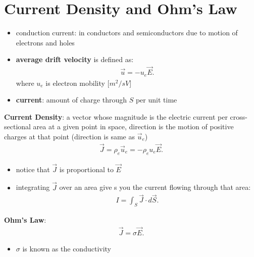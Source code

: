 \documentclass[10pt]{article}
\begin{document}
\section{Current Density and Ohm's Law}
\begin{itemize}
    \item conduction current: in conductors and semiconductors due to motion of electrons and holes
    \item \textbf{average drift velocity} is defined as:
        \begin{gather*}
            \vec{u} = -u_e \vec{E} 
        .\end{gather*}
        where $u_e$ is electron mobility [$m^2 / sV$]
    \item \textbf{current}: amount of charge through $S$ per unit time
\end{itemize}
\begin{definition}
    \textbf{Current Density}: a vector whose magnitude is the electric current per cross-sectional area at a given point in space, direction is the motion of positive charges at that point (direction is same as $\vec{u}_e$)
    \begin{gather*}
        \vec{J} = \rho_e \vec{u}_e = -\rho_e u_e \vec{E} 
    .\end{gather*}
    \begin{itemize}
        \item notice that $\vec{J}$ is proportional to $\vec{E}$
        \item integrating $\vec{J}$ over an area give s you the current flowing through that area:
            \begin{gather*}
                I = \int_{S} \vec{J} \cdot d\vec{S}  
            .\end{gather*}
    \end{itemize}
\end{definition}
\begin{theorem}
    \textbf{Ohm's Law}:
    \begin{gather*}
        \vec{J} = \sigma \vec{E}
    .\end{gather*}
    \begin{itemize}
        \item $\sigma$ is known as the conductivity
    \end{itemize}
\end{theorem}
\end{document}
